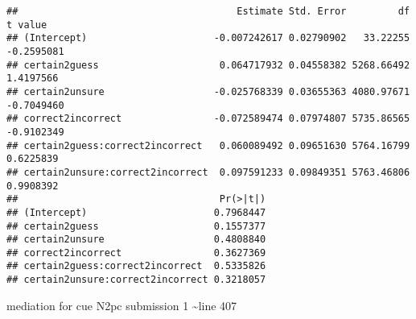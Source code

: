 \documentclass[
]{article}
\newenvironment{Shaded}{\begin{snugshade}}{\end{snugshade}}
\newcommand{\FunctionTok}[1]{\textcolor[rgb]{0.00,0.00,0.00}{#1}}
\newcommand{\NormalTok}[1]{#1}
\newcommand{\SpecialCharTok}[1]{\textcolor[rgb]{0.00,0.00,0.00}{#1}}
\begin{document}
\begin{Shaded}
\end{Shaded}

\begin{verbatim}
##                                      Estimate Std. Error         df    t value
## (Intercept)                      -0.007242617 0.02790902   33.22255 -0.2595081
## certain2guess                     0.064717932 0.04558382 5268.66492  1.4197566
## certain2unsure                   -0.025768339 0.03655363 4080.97671 -0.7049460
## correct2incorrect                -0.072589474 0.07974807 5735.86565 -0.9102349
## certain2guess:correct2incorrect   0.060089492 0.09651630 5764.16799  0.6225839
## certain2unsure:correct2incorrect  0.097591233 0.09849351 5763.46806  0.9908392
##                                   Pr(>|t|)
## (Intercept)                      0.7968447
## certain2guess                    0.1557377
## certain2unsure                   0.4808840
## correct2incorrect                0.3627369
## certain2guess:correct2incorrect  0.5335826
## certain2unsure:correct2incorrect 0.3218057
\end{verbatim}

mediation for cue N2pc submission 1 \textasciitilde line 407
\end{document}
